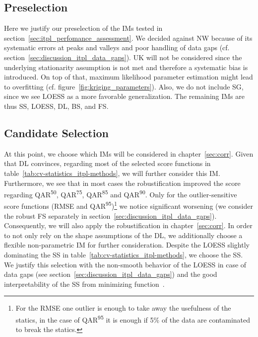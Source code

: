 {    \subsection{Preselection}{\label{sec:itpl_preselection}
        Here we justify our preselection of the {{IM}}s tested in section~\ref{sec:itpl_perfomance_assessment}. 
        We decided against NW because of its systematic errors at peaks and valleys and poor handling of data gaps (cf. section~\ref{sec:discussion_itpl_data_gaps}). 
        UK will not be considered since the underlying stationarity assumption is not met and therefore a systematic bias is introduced. On top of that, maximum likelihood parameter estimation might lead to overfitting (cf. figure~\ref{fig:kriging_parameters}).
        Also, we do not include SG, since we see LOESS as a more favorable generalization.
        The remaining IMs are thus SS, LOESS, DL, BS, and FS.
    }

    \subsection{Candidate Selection}{\label{sec:itpl_candiate_selection}
        At this point, we choose which IMs will be considered in chapter~\ref{sec:corr}.
        Given that DL convinces, regarding most of the selected score functions in table~\ref{tab:cv-statistics_itpl-methods}, we will further consider this IM. Furthermore, we see that in most cases the robustification improved the score regarding QAR\textsuperscript{50}, QAR\textsuperscript{75}, QAR\textsuperscript{85} and QAR\textsuperscript{90}. Only for the outlier-sensitive score functions (RMSE and QAR\textsuperscript{95})\footnote{For the RMSE one outlier is enough to take away the usefulness of the statics, in the case of QAR\textsuperscript{95} it is enough if 5\% of the data are contaminated to break the statics.} we notice significant worsening (we consider the robust FS separately in section~\ref{sec:discussion_itpl_data_gaps}). Consequently, we will also apply the robustification in chapter~\ref{sec:corr}.
        In order to not only rely on the shape assumptions of the DL, we additionally choose a flexible non-parametric IM for further consideration. Despite the LOESS slightly dominating the SS in table~\ref{tab:cv-statistics_itpl-methods}, we choose the SS. We justify this selection with the non-smooth behavior of the LOESS in case of data gaps (see section~\ref{sec:discussion_itpl_data_gaps}) and the good interpretability of the SS from minimizing function~.
    }
}


